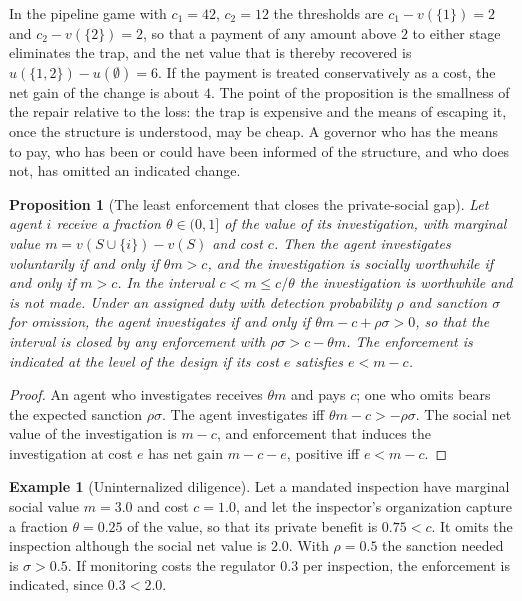 \documentclass[11pt]{article}
\theoremstyle{plain}
\newtheorem{proposition}{Proposition}
\theoremstyle{definition}
\newtheorem{example}{Example}
\begin{document}
In the pipeline game with $c_1=42$, $c_2=12$ the thresholds are $c_1-v(\{1\})=2$ and $c_2-v(\{2\})=2$, so that a payment of any amount above $2$ to either stage eliminates the trap, and the net value that is thereby recovered is $u(\{1,2\})-u(\emptyset)=6$. If the payment is treated conservatively as a cost, the net gain of the change is about $4$. The point of the proposition is the smallness of the repair relative to the loss: the trap is expensive and the means of escaping it, once the structure is understood, may be cheap. A governor who has the means to pay, who has been or could have been informed of the structure, and who does not, has omitted an indicated change.

\begin{proposition}[The least enforcement that closes the private-social gap]\label{prop:enforce}
Let agent $i$ receive a fraction $\theta\in(0,1]$ of the value of its investigation, with marginal value $m=v(S\cup\{i\})-v(S)$ and cost $c$. Then the agent investigates voluntarily if and only if $\theta m>c$, and the investigation is socially worthwhile if and only if $m>c$. In the interval $c<m\le c/\theta$ the investigation is worthwhile and is not made. Under an assigned duty with detection probability $\rho$ and sanction $\sigma$ for omission, the agent investigates if and only if $\theta m-c+\rho\sigma>0$, so that the interval is closed by any enforcement with $\rho\sigma>c-\theta m$. The enforcement is indicated at the level of the design if its cost $e$ satisfies $e<m-c$.
\end{proposition}

\begin{proof}
An agent who investigates receives $\theta m$ and pays $c$; one who omits bears the expected sanction $\rho\sigma$. The agent investigates iff $\theta m-c>-\rho\sigma$. The social net value of the investigation is $m-c$, and enforcement that induces the investigation at cost $e$ has net gain $m-c-e$, positive iff $e<m-c$.
\end{proof}

\begin{example}[Uninternalized diligence]\label{ex:enforce}
Let a mandated inspection have marginal social value $m=3.0$ and cost $c=1.0$, and let the inspector's organization capture a fraction $\theta=0.25$ of the value, so that its private benefit is $0.75<c$. It omits the inspection although the social net value is $2.0$. With $\rho=0.5$ the sanction needed is $\sigma>0.5$. If monitoring costs the regulator $0.3$ per inspection, the enforcement is indicated, since $0.3<2.0$.
\end{example}
\end{document}
